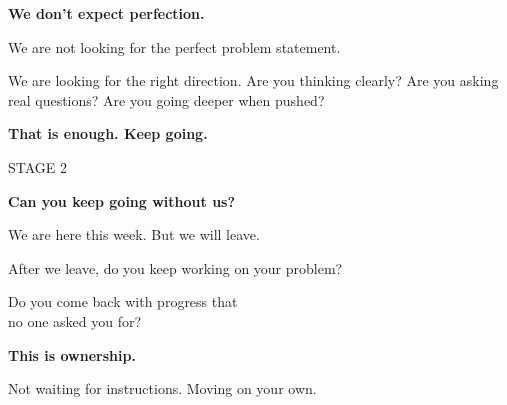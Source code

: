\documentclass[aspectratio=169]{beamer}
\begin{document}
\begin{frame}{}
\vfill
\begin{center}
{\fontsize{26}{32}\selectfont\bfseries We don't expect perfection.\par}
\vspace{30pt}
\begin{minipage}{0.80\textwidth}
{\color{darktext}We are not looking for the perfect problem statement.\par}
\vspace{14pt}
{\color{darktext}We are looking for the right direction. Are you thinking clearly? Are you asking real questions? Are you going deeper when pushed?\par}
\vspace{14pt}
{\color{accent}\bfseries That is enough. Keep going.\par}
\end{minipage}
\end{center}
\vfill
\end{frame}

\begin{frame}{}
\vfill
\begin{center}
{\color{stage}\fontsize{18}{22}\selectfont STAGE 2\par}
\vspace{8pt}
{\fontsize{28}{34}\selectfont\bfseries Can you keep going without us?\par}
\vspace{20pt}
\begin{minipage}{0.80\textwidth}
{\color{darktext}We are here this week. But we will leave.\par}
\vspace{10pt}
{\color{darktext}After we leave, do you keep working on your problem?\par}
\vspace{4pt}
{\color{darktext}Do you come back with progress that\\no one asked you for?\par}
\vspace{14pt}
{\color{accent}\bfseries This is ownership.\par}
\vspace{4pt}
{\color{dimtext}Not waiting for instructions. Moving on your own.\par}
\end{minipage}
\end{center}
\vfill
\end{frame}
\end{document}
